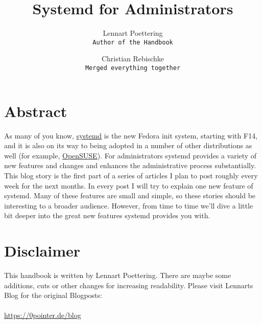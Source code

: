 \documentclass[titlepage]{article}
\title{Systemd for Administrators}
\author{
    Lennart Poettering\\
    \texttt{Author of the Handbook}
    \and
    Christian Rebischke\\
    \texttt{Merged everything together}
}
\begin{document}
\maketitle
\tableofcontents
\newpage

\section{Abstract}
As many of you know,
\href{https://www.freedesktop.org/wiki/Software/systemd}{systemd} is the new
Fedora init system, starting with F14, and it is also on its way to being
adopted in a number of other distributions as well (for example,
\href{https://en.opensuse.org/SDB:Systemd}{OpenSUSE}). For administrators
systemd provides a variety of new features and changes and enhances the
administrative process substantially. This blog story is the first part of a
series of articles I plan to post roughly every week for the next months. In
every post I will try to explain one new feature of systemd. Many of these
features are small and simple, so these stories should be interesting to a
broader audience. However, from time to time we'll dive a little bit deeper
into the great new features systemd provides you with.  
\section{Disclaimer}
This handbook is written by Lennart Poettering. There are maybe some 
additions, cuts or other changes for increasing readability.
Please visit Lennarts Blog for the original Blogposts:
\\
\\
\url{https://0pointer.de/blog}
\newpage
\end{document}
